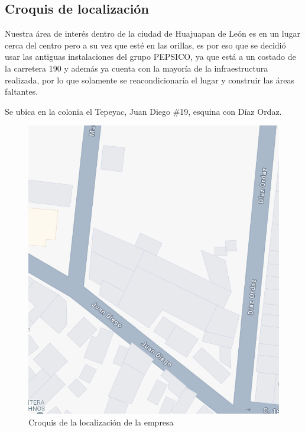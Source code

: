 \subsection{Croquis de localización}
Nuestra área de interés dentro de la ciudad de Huajuapan de León es en un lugar cerca del centro pero a su vez que esté en las orillas, es por eso que se decidió usar las antiguas instalaciones del grupo PEPSICO, ya que está a un costado de la carretera 190 y además ya cuenta con la mayoría de la infraestructura realizada, por lo que solamente se reacondicionaría el lugar y construir las áreas faltantes. 

Se ubica en la colonia el Tepeyac, Juan Diego \#19, esquina con Díaz Ordaz.

\begin{figure}[H]
    \centering	
    \includegraphics[width=.7\textwidth]{img/Empresa/ubicacion1.png} 
    \caption{Croquis de la localización de la empresa}
\label{fig:croquis1}
\end{figure}

